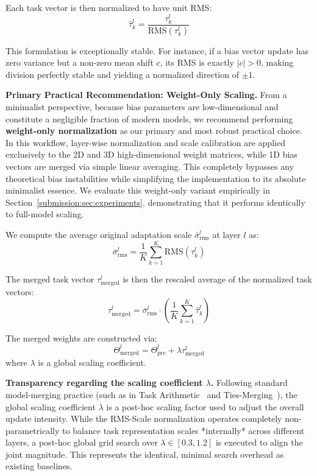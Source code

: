 Each task vector is then normalized to have unit RMS:
\begin{equation}
\hat{\tau}_k^l = \frac{\tau_k^l}{\text{RMS}(\tau_k^l)}
\end{equation}

This formulation is exceptionally stable. For instance, if a bias vector update has zero variance but a non-zero mean shift $c$, its RMS is exactly $|c| > 0$, making division perfectly stable and yielding a normalized direction of $\pm 1$.

\textbf{Primary Practical Recommendation: Weight-Only Scaling.} From a minimalist perspective, because bias parameters are low-dimensional and constitute a negligible fraction of modern models, we recommend performing \textbf{weight-only normalization} as our primary and most robust practical choice. In this workflow, layer-wise normalization and scale calibration are applied exclusively to the 2D and 3D high-dimensional weight matrices, while 1D bias vectors are merged via simple linear averaging. This completely bypasses any theoretical bias instabilities while simplifying the implementation to its absolute minimalist essence. We evaluate this weight-only variant empirically in Section~\ref{submission:sec:experiments}, demonstrating that it performs identically to full-model scaling.

We compute the average original adaptation scale $\bar{\sigma}_{\text{rms}}^l$ at layer $l$ as:
\begin{equation}
\bar{\sigma}_{\text{rms}}^l = \frac{1}{K} \sum_{k=1}^K \text{RMS}(\tau_k^l)
\end{equation}

The merged task vector $\tau_{\text{merged}}^l$ is then the rescaled average of the normalized task vectors:
\begin{equation}
\tau_{\text{merged}}^l = \bar{\sigma}_{\text{rms}}^l \cdot \left( \frac{1}{K} \sum_{k=1}^K \hat{\tau}_k^l \right)
\end{equation}

The merged weights are constructed via:
\begin{equation}
\Theta_{\text{merged}}^l = \Theta_{\text{pre}}^l + \lambda \tau_{\text{merged}}^l
\end{equation}
where $\lambda$ is a global scaling coefficient. 

\textbf{Transparency regarding the scaling coefficient $\lambda$.} Following standard model-merging practice (such as in Task Arithmetic~\cite{ilharco2022editing} and Ties-Merging~\cite{yadav2023resolving}), the global scaling coefficient $\lambda$ is a post-hoc scaling factor used to adjust the overall update intensity. While the RMS-Scale normalization operates completely non-parametrically to balance task representation scales *internally* across different layers, a post-hoc global grid search over $\lambda \in [0.3, 1.2]$ is executed to align the joint magnitude. This represents the identical, minimal search overhead as existing baselines.

